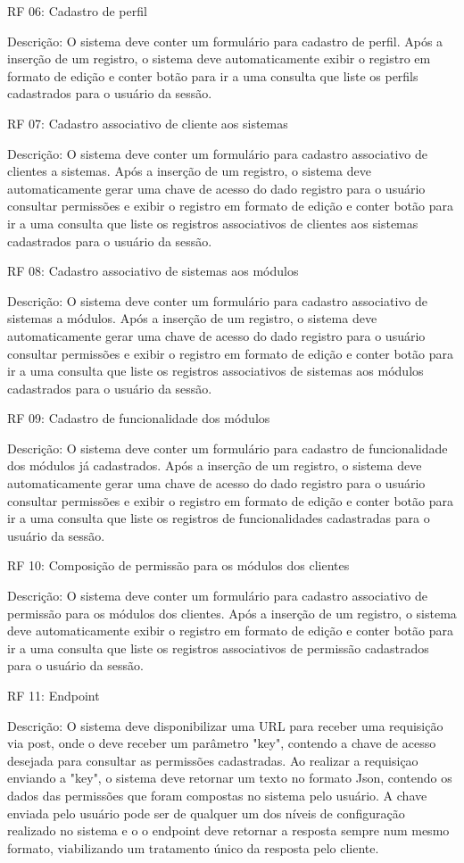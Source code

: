 RF 06: Cadastro de perfil


Descrição: O sistema deve conter um formulário para cadastro de perfil. Após a inserção de um registro, o sistema deve automaticamente exibir o registro em formato de edição e conter botão para ir a uma consulta que liste os perfils cadastrados para o usuário da sessão.


RF 07: Cadastro associativo de cliente aos sistemas


Descrição: O sistema deve conter um formulário para cadastro associativo de clientes a sistemas. Após a inserção de um registro, o sistema deve automaticamente gerar uma chave de acesso do dado registro para o usuário consultar permissões e exibir o registro em formato de edição e conter botão para ir a uma consulta que liste os registros associativos de clientes aos sistemas cadastrados para o usuário da sessão.


RF 08: Cadastro associativo de  sistemas aos módulos


Descrição: O sistema deve conter um formulário para cadastro associativo de sistemas a módulos. Após a inserção de um registro, o sistema deve automaticamente gerar uma chave de acesso do dado registro para o usuário consultar permissões e exibir o registro em formato de edição e conter botão para ir a uma consulta que liste os registros associativos de  sistemas aos módulos cadastrados para o usuário da sessão.


RF 09: Cadastro de funcionalidade dos módulos


Descrição: O sistema deve conter um formulário para cadastro de funcionalidade dos módulos já cadastrados. Após a inserção de um registro, o sistema deve automaticamente gerar uma chave de acesso do dado registro para o usuário consultar permissões e exibir o registro em formato de edição e conter botão para ir a uma consulta que liste os registros de funcionalidades cadastradas para o usuário da sessão.


RF 10: Composição de permissão para os módulos dos clientes


Descrição: O sistema deve conter um formulário para cadastro associativo de permissão para os módulos dos clientes. Após a inserção de um registro, o sistema deve automaticamente exibir o registro em formato de edição e conter botão para ir a uma consulta que liste os registros associativos de permissão cadastrados para o usuário da sessão.


RF 11: Endpoint


Descrição: O sistema deve disponibilizar uma URL para receber uma requisição via post, onde o deve receber um parâmetro "key", contendo a chave de acesso desejada para consultar as permissões cadastradas. Ao realizar a requisiçao enviando a "key", o sistema deve retornar um texto no formato Json, contendo os dados das permissões que foram compostas no sistema pelo usuário. A chave enviada pelo usuário pode ser de qualquer um dos níveis de configuração realizado no sistema e o o endpoint deve retornar a resposta sempre num mesmo formato, viabilizando um tratamento único da resposta pelo cliente.


